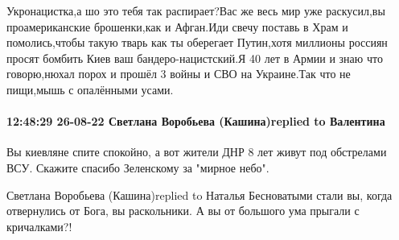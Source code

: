 Укронацистка,а шо это тебя так распирает?Вас же весь мир уже раскусил,вы
проамериканские брошенки,как и Афган.Иди свечу поставь в Храм и помолись,чтобы
такую тварь как ты оберегает Путин,хотя миллионы россиян просят бомбить Киев
ваш бандеро-нацистский.Я 40 лет в Армии и знаю что говорю,нюхал порох и прошёл
3 войны и СВО на Украине.Так что не пищи,мышь с опалёнными усами.


\paragraph{12:48:29 26-08-22 Светлана Воробьева (Кашина)replied to Валентина}

Вы киевляне спите спокойно, а вот жители ДНР 8 лет живут под обстрелами ВСУ.
Скажите спасибо Зеленскому за "мирное небо".

Светлана Воробьева (Кашина)replied to Наталья
Бесноватыми стали вы, когда отвернулись от Бога, вы раскольники. А вы от большого ума прыгали с кричалками?!

